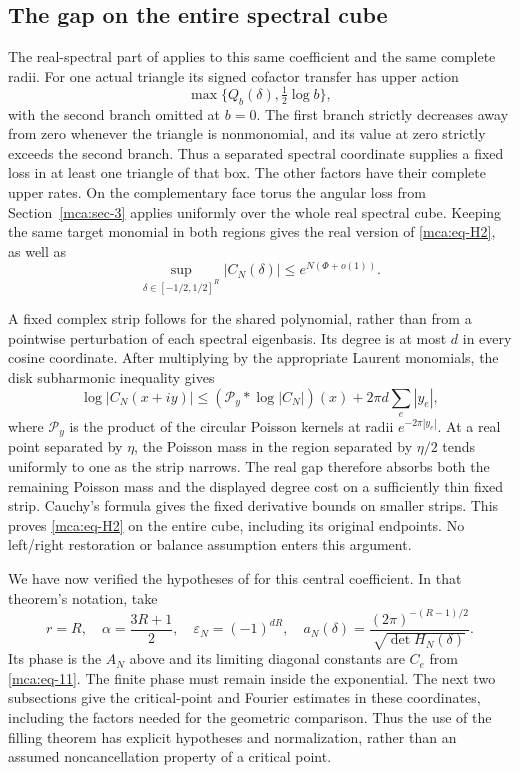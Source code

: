 \subsection{The gap on the entire spectral cube}\label{mca:sec-5}

The real-spectral part of \cite[Theorem~8.1]{CasimirSources} applies
to this same coefficient and the same complete radii. For one actual
triangle its signed cofactor transfer has upper action
\[
 \max\{Q_b(\delta),\tfrac12\log b\},
\]
with the second branch omitted at \(b=0\).
The first branch strictly decreases away from zero whenever the
triangle is nonmonomial, and its value at zero strictly exceeds the
second branch. Thus a separated spectral coordinate supplies a fixed
loss in at least one triangle of that box. The other factors have
their complete upper rates. On the complementary face torus the
angular loss from Section~\ref{mca:sec-3} applies uniformly over the
whole real spectral cube. Keeping the same target monomial in both
regions gives the real version of \eqref{mca:eq-H2}, as well as
\[
 \sup_{\delta\in[-1/2,1/2]^R}|C_N(\delta)|
       \le e^{N(\Phi+o(1))}.
\]

A fixed complex strip follows for the shared polynomial, rather than
from a pointwise perturbation of each spectral eigenbasis. Its degree
is at most \(d\) in every cosine coordinate. After multiplying by the
appropriate Laurent monomials, the disk subharmonic inequality gives
\[
 \log|C_N(x+iy)|
 \le (\mathcal P_y*\log|C_N|)(x)+2\pi d\sum_e|y_e|,
\]
where \(\mathcal P_y\) is the product of the circular Poisson kernels
at radii \(e^{-2\pi|y_e|}\). At a real point separated by \(\eta\),
the Poisson mass in the region separated by \(\eta/2\) tends uniformly
to one as the strip narrows. The real gap therefore absorbs both the
remaining Poisson mass and the displayed degree cost on a sufficiently
thin fixed strip. Cauchy's formula gives the fixed derivative bounds
on smaller strips. This proves \eqref{mca:eq-H2} on the entire cube,
including its original endpoints. No left/right restoration or balance
assumption enters this argument.

We have now verified the hypotheses of \cite[Theorem 1.1]{Filling}
for this central coefficient. In that theorem's notation, take
\[
 r=R,\quad \alpha=\frac{3R+1}{2},\quad
 \varepsilon_N=(-1)^{dR},\quad
 a_N(\delta)=\frac{(2\pi)^{-(R-1)/2}}{\sqrt{\det H_N(\delta)}}.
\]
Its phase is the $A_N$ above and its limiting diagonal constants are
$C_e$ from \eqref{mca:eq-11}. The finite phase must remain inside the
exponential. The next two subsections give the critical-point and
Fourier estimates in these coordinates, including the factors needed
for the geometric comparison. Thus the use of the filling theorem
has explicit hypotheses and normalization, rather than an assumed
noncancellation property of a critical point.

